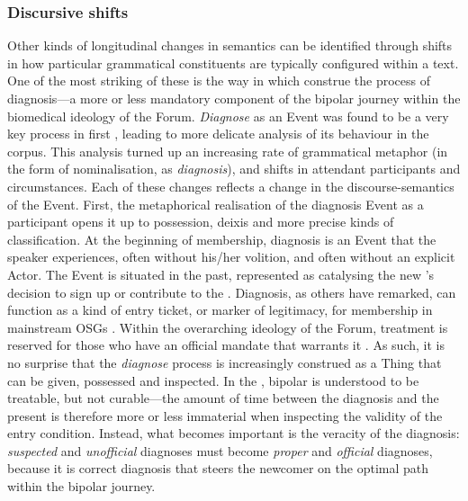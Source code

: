 \subsubsection{Discursive shifts}



Other kinds of longitudinal changes in semantics can be identified through shifts in how particular grammatical constituents are typically configured within a text. One of the most striking of these is the way in which  construe the process of diagnosis---a more or less mandatory component of the \gls{bipolar} journey within the biomedical ideology of the \gls{Forum}. \emph{Diagnose} as an Event was found to be a very key process in first , leading to more delicate analysis of its behaviour in the \gls{corpus}. This analysis turned up an increasing rate of grammatical metaphor (in the form of nominalisation, as \emph{diagnosis}), and shifts in attendant participants and circumstances. Each of these changes reflects a change in the \glspl{discourse-semantic} of the Event. First, the metaphorical realisation of the diagnosis Event as a participant opens it up to possession, deixis and more precise kinds of classification. At the beginning of membership, diagnosis is an Event that the speaker experiences, often without his\slash her volition, and often without an explicit Actor. The Event is situated in the past, represented as catalysing the new 's decision to sign up or contribute to the . Diagnosis, as others have remarked, can function as a kind of entry ticket, or marker of legitimacy, for membership in mainstream \glspl{OSG} \cite{stommel_use_2011}. Within the overarching ideology of the \gls{Forum}, treatment \cite[including the talk therapy provided by \gls{Forum} interaction itself---see][]{kaufman2016producing} is reserved for those who have an official mandate that warrants it \cite{vayreda_social_2009}. As such, it is no surprise that the \emph{diagnose} process is increasingly construed as a Thing that can be given, possessed and inspected. In the , \gls{bipolar} is understood to be treatable, but not curable---the amount of time between the diagnosis and the present is therefore more or less immaterial when inspecting the validity of the entry condition. Instead, what becomes important is the veracity of the diagnosis: \emph{suspected} and \emph{unofficial} diagnoses must become \emph{proper} and \emph{official} diagnoses, because it is correct diagnosis that steers the newcomer on the optimal path within the \gls{bipolar} journey.

